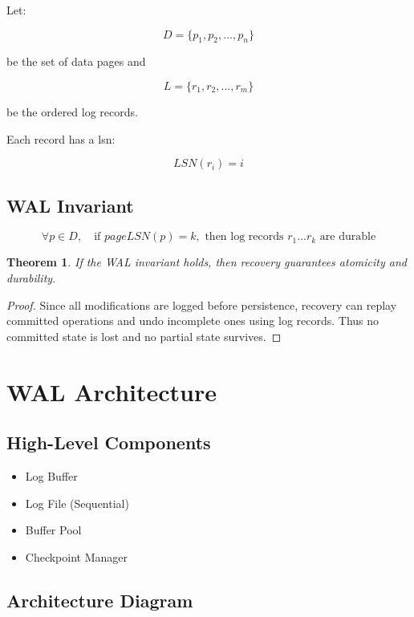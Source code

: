 \documentclass[12pt,a4paper]{report}
\newtheorem{theorem}{Theorem}[chapter]
\begin{document}
Let:

\[
D = \{p_1, p_2, ..., p_n\}
\]

be the set of data pages and

\[
L = \{r_1, r_2, ..., r_m\}
\]

be the ordered log records.

Each record has a \gls{lsn}:

\[
LSN(r_i) = i
\]

\section{WAL Invariant}

\[
\forall p \in D,\quad \text{if } pageLSN(p) = k,\text{ then log records } r_1...r_k \text{ are durable}
\]

\begin{theorem}
If the WAL invariant holds, then recovery guarantees atomicity and durability.
\end{theorem}

\begin{proof}
Since all modifications are logged before persistence, recovery can replay committed operations and undo incomplete ones using log records. Thus no committed state is lost and no partial state survives.
\end{proof}

\chapter{WAL Architecture}

\section{High-Level Components}

\begin{itemize}
    \item Log Buffer
    \item Log File (Sequential)
    \item Buffer Pool
    \item Checkpoint Manager
\end{itemize}

\section{Architecture Diagram}

\begin{center}
\end{center}
\end{document}
